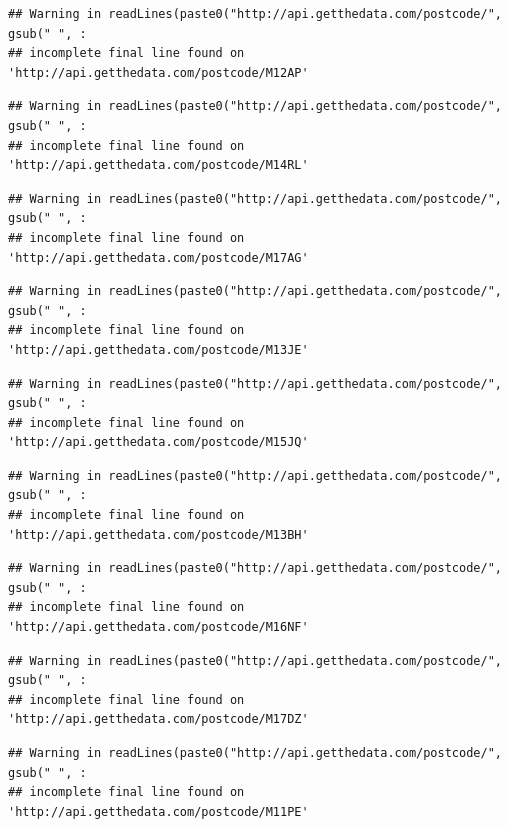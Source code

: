 \documentclass[]{book}
\begin{document}
\begin{verbatim}
## Warning in readLines(paste0("http://api.getthedata.com/postcode/", gsub(" ", :
## incomplete final line found on 'http://api.getthedata.com/postcode/M12AP'
\end{verbatim}

\begin{verbatim}
## Warning in readLines(paste0("http://api.getthedata.com/postcode/", gsub(" ", :
## incomplete final line found on 'http://api.getthedata.com/postcode/M14RL'
\end{verbatim}

\begin{verbatim}
## Warning in readLines(paste0("http://api.getthedata.com/postcode/", gsub(" ", :
## incomplete final line found on 'http://api.getthedata.com/postcode/M17AG'
\end{verbatim}

\begin{verbatim}
## Warning in readLines(paste0("http://api.getthedata.com/postcode/", gsub(" ", :
## incomplete final line found on 'http://api.getthedata.com/postcode/M13JE'
\end{verbatim}

\begin{verbatim}
## Warning in readLines(paste0("http://api.getthedata.com/postcode/", gsub(" ", :
## incomplete final line found on 'http://api.getthedata.com/postcode/M15JQ'
\end{verbatim}

\begin{verbatim}
## Warning in readLines(paste0("http://api.getthedata.com/postcode/", gsub(" ", :
## incomplete final line found on 'http://api.getthedata.com/postcode/M13BH'
\end{verbatim}

\begin{verbatim}
## Warning in readLines(paste0("http://api.getthedata.com/postcode/", gsub(" ", :
## incomplete final line found on 'http://api.getthedata.com/postcode/M16NF'
\end{verbatim}

\begin{verbatim}
## Warning in readLines(paste0("http://api.getthedata.com/postcode/", gsub(" ", :
## incomplete final line found on 'http://api.getthedata.com/postcode/M17DZ'
\end{verbatim}

\begin{verbatim}
## Warning in readLines(paste0("http://api.getthedata.com/postcode/", gsub(" ", :
## incomplete final line found on 'http://api.getthedata.com/postcode/M11PE'
\end{verbatim}
\end{document}
